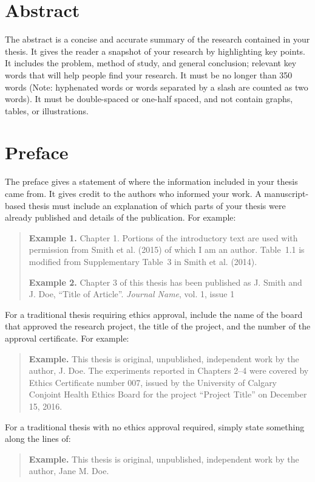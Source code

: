 
\chapter{Abstract}

The abstract is a concise and accurate summary of the research
contained in your thesis. It gives the reader a snapshot of your
research by highlighting key points. It includes the problem, method of
study, and general conclusion; relevant key words that will help
people find your research. It must be no longer than 350 words (Note:
hyphenated words or words separated by a slash are counted as two
words). It must be double-spaced or one-half spaced, and not contain
graphs, tables, or illustrations.

\chapter{Preface}

The preface gives a statement of where the information included in
your thesis came from. It gives credit to the authors who informed
your work.  A manuscript-based thesis must include an explanation of
which parts of your thesis were already published and details of the
publication. For example:
\begin{quote}
\textbf{Example 1.} Chapter 1. Portions of the introductory text are
used with permission from Smith et al. (2015) of which I am an author.
Table~1.1 is modified from Supplementary Table~3 in Smith et al.
(2014).

\textbf{Example 2.} Chapter 3 of this thesis has been published as J. Smith and J. Doe, ``Title
of Article''. \emph{Journal Name}, vol. 1, issue 1
\end{quote}
For a traditional thesis requiring ethics approval, include the name
of the board that approved the research project, the title of the
project, and the number of the approval certificate. For example:
\begin{quote}
\textbf{Example.} This thesis is original, unpublished, independent
work by the author, J. Doe.  The experiments reported in Chapters 2--4
were covered by Ethics Certificate number 007, issued by the
University of Calgary Conjoint Health Ethics Board for the project
``Project Title'' on December 15, 2016.
\end{quote}
For a traditional thesis with no ethics approval required, simply
state something along the lines of:
\begin{quote}
\textbf{Example.} This thesis is original, unpublished, independent
work by the author, Jane M. Doe.
\end{quote}

